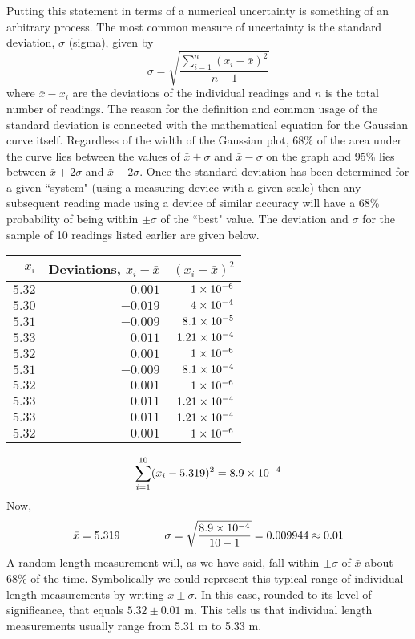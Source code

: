 \documentclass[main.tex]{subfiles}
\begin{document}
Putting this statement in terms of a numerical uncertainty is something of an arbitrary process.    The most common measure of uncertainty is the standard deviation, $\sigma$ (sigma), given by
\[\label{page:stdDev}
\sigma = \sqrt{\frac{\sum_{i=1}^{n} (x_i-\bar{x})^2}{n-1}}
\]
where $\bar{x}-x_i$ are the deviations of the individual readings and $n$ is the total number of readings. The reason for the definition and common usage of the standard deviation is connected with the mathematical equation for the Gaussian curve itself.  Regardless of the width of the Gaussian plot, 68\% of the area under the curve lies between the values of $\bar{x}+\sigma$ and $\bar{x}-\sigma$ on the graph and 95\% lies between $\bar{x}+2\sigma$ and $\bar{x}-2\sigma.$  Once the standard deviation has been determined for a given ``system" (using a measuring device with a given scale) then any subsequent reading made using a device of similar accuracy will have a 68\% probability of being within $\pm\sigma$ of the ``best" value.  The deviation and $\sigma$ for the sample of 10 readings listed earlier are given below.
\begin{table}[h]
\centering
\begin{tabular}{r|r|r}
$x_i$ & Deviations, $x_i-\bar{x}$ & $(x_i-\bar{x})^2$\\
\hline
$5.32$ & $0.001$ & $1\times 10^{-6}$\\
$5.30$ & $-0.019$ & $4\times 10^{-4}$\\
$5.31$ & $-0.009$ & $8.1\times 10^{-5}$\\
$5.33$ & $0.011$ & $	1.21\times 10^{-4}$\\
$5.32$ & $0.001$ & $	1\times 10^{-6}$\\ 
$5.31$ & $-0.009$ & $8.1\times 10^{-4}$\\
$5.32$ & $0.001$ & $	1\times 10^{-6}$\\
$5.33$ & $0.011$ & $	1.21\times 10^{-4}$\\
$5.33$ & $0.011$ & $	1.21\times 10^{-4}$\\
$5.32$ & $0.001$ & $1\times 10^{-6}$
\end{tabular}
\end{table}
\FloatBarrier
\[
\sum_{i=1}^{10}(x_i-5.319)^2 = 8.9\times 10^{-4}
\]
Now,
\[
\bar{x}=5.319 \qquad \qquad \sigma = \sqrt{\frac{8.9\times 10^{-4}}{10-1}} = 0.009944\approx 0.01
\]
A random length measurement will, as we have said, fall within $\pm\sigma$ of $\bar{x}$ about 68\% of the time. Symbolically we could represent this typical range of individual length measurements by writing $\bar{x}\pm\sigma.$ In this case, rounded to its level of significance, that equals $5.32\pm0.01\text{ m}.$ This tells us that individual length measurements usually range from 5.31 m to 5.33 m.
\end{document}
